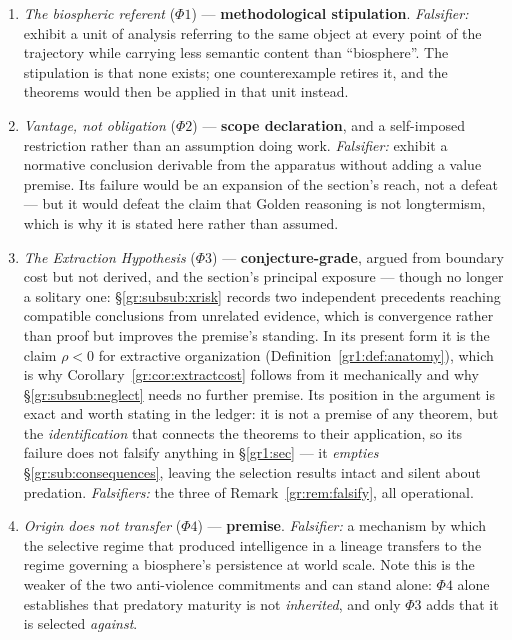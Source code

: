 \documentclass[11pt]{article}
\numberwithin{equation}{section}
\theoremstyle{plain}
\theoremstyle{definition}
\theoremstyle{remark}
\begin{document}
\begin{enumerate}[itemsep=2pt]
\item \emph{The biospheric referent} ($\Phi1$) ---
\textbf{methodological stipulation}. \emph{Falsifier:} exhibit a unit of
analysis referring to the same object at every point of the trajectory
while carrying less semantic content than ``biosphere''. The stipulation
is that none exists; one counterexample retires it, and the theorems
would then be applied in that unit instead.

\item \emph{Vantage, not obligation} ($\Phi2$) --- \textbf{scope
declaration}, and a self-imposed restriction rather than an assumption
doing work. \emph{Falsifier:} exhibit a normative conclusion derivable
from the apparatus without adding a value premise. Its failure would be
an expansion of the section's reach, not a defeat --- but it would
defeat the claim that Golden reasoning is not longtermism, which is why it is stated here rather than assumed.

\item \emph{The Extraction Hypothesis} ($\Phi3$) ---
\textbf{conjecture-grade}, argued from boundary cost but not derived,
and the section's principal exposure --- though no longer a solitary
one: \S\ref{gr:subsub:xrisk} records two independent precedents
\cite{Tainter88,Bostrom19} reaching compatible conclusions from
unrelated evidence, which is convergence rather than proof but improves
the premise's standing. In its present form it is the
claim $\rho<0$ for extractive organization
(Definition~\ref{gr1:def:anatomy}), which is why
Corollary~\ref{gr:cor:extractcost} follows from it mechanically and why
\S\ref{gr:subsub:neglect} needs no further premise. Its position in the argument is
exact and worth stating in the ledger: it is not a premise of any
theorem, but the \emph{identification} that connects the theorems to
their application, so its failure does not falsify anything in
\S\ref{gr1:sec} --- it \emph{empties}
\S\ref{gr:sub:consequences}, leaving the selection results intact and
silent about predation. \emph{Falsifiers:} the three of
Remark~\ref{gr:rem:falsify}, all operational.

\item \emph{Origin does not transfer} ($\Phi4$) --- \textbf{premise}.
\emph{Falsifier:} a mechanism by which the selective regime that
produced intelligence in a lineage transfers to the regime governing a
biosphere's persistence at world scale. Note this is the weaker of the
two anti-violence commitments and can stand alone: $\Phi4$ alone
establishes that predatory maturity is not \emph{inherited}, and only
$\Phi3$ adds that it is selected \emph{against}.


\end{enumerate}
\end{document}
